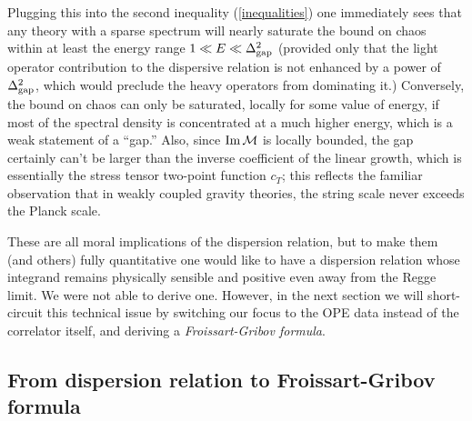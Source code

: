 \documentclass[11pt, reqno,preprint]{article}
\begin{document}
Plugging this into the second inequality (\ref{inequalities}) one immediately sees that any theory with a sparse spectrum
will nearly saturate the bound on chaos within at least the energy range $1\ll E\ll \Delta_{\rm gap}^2$
(provided only that the light operator contribution to the dispersive relation is not enhanced by a power of $\Delta_{\rm gap}^2$,
which would preclude the heavy operators from dominating it.)
Conversely, the bound on chaos can only be saturated, locally for some value of energy,
if most of the spectral density is concentrated at a much higher energy, which is a weak statement of a ``gap.''
Also, since ${\rm Im}\,\mathcal{M}$ is locally bounded, the gap certainly can't be larger than the inverse coefficient of the linear growth,
which is essentially the stress tensor two-point function $c_T$; this reflects the familiar observation that in weakly coupled gravity theories, the string scale never exceeds the Planck scale.

These are all moral implications of the dispersion relation, but to make them (and others) fully quantitative
one would like to have a dispersion relation whose integrand remains physically sensible and positive
even away from the Regge limit. We were not able to derive one.
However, in the next section we will short-circuit this technical issue by switching our focus to the OPE data
instead of the correlator itself, and deriving a \emph{Froissart-Gribov formula}.

\subsection{From dispersion relation to Froissart-Gribov formula}
\label{ssec:fg0}
\end{document}
